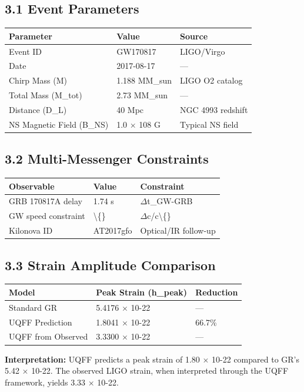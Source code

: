 \documentclass[11pt]{article}
\begin{document}
\subsection*{3.1 Event Parameters}

\begin{center}
\begin{longtable}{lll}
\toprule
Parameter & Value & Source \tabularnewline
\midrule
\endhead
Event ID & GW170817 & LIGO/Virgo \tabularnewline
Date & 2017-08-17 & --- \tabularnewline
Chirp Mass (M) & 1.188 MM\_sun & LIGO O2 catalog \tabularnewline
Total Mass (M\_tot) & 2.73 MM\_sun & --- \tabularnewline
Distance (D\_L) & 40 Mpc & NGC 4993 redshift \tabularnewline
NS Magnetic Field (B\_NS) & 1.0 $\times$ 108 G & Typical NS field \tabularnewline
\bottomrule
\end{longtable}
\end{center}

\subsection*{3.2 Multi-Messenger Constraints}

\begin{center}
\begin{longtable}{lll}
\toprule
Observable & Value & Constraint \tabularnewline
\midrule
\endhead
GRB 170817A delay & 1.74 s & $\Delta$t\_GW-GRB \tabularnewline
GW speed constraint & \textbackslash\{\} & $\Delta$c/c\textbackslash\{\} \tabularnewline
Kilonova ID & AT2017gfo & Optical/IR follow-up \tabularnewline
\bottomrule
\end{longtable}
\end{center}

\subsection*{3.3 Strain Amplitude Comparison}

\begin{center}
\begin{longtable}{lll}
\toprule
Model & Peak Strain (h\_peak) & Reduction \tabularnewline
\midrule
\endhead
Standard GR & 5.4176 $\times$ 10-22 & --- \tabularnewline
UQFF Prediction & 1.8041 $\times$ 10-22 & 66.7\% \tabularnewline
UQFF from Observed & 3.3300 $\times$ 10-22 & --- \tabularnewline
\bottomrule
\end{longtable}
\end{center}

\textbf{Interpretation:} UQFF predicts a peak strain of 1.80 $\times$ 10-22 compared to GR's 5.42 $\times$ 10-22. The observed LIGO strain, when interpreted through the UQFF framework, yields 3.33 $\times$ 10-22.
\end{document}
